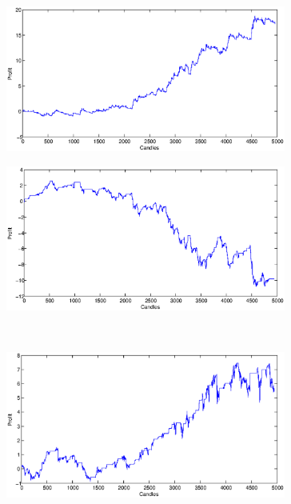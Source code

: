 \documentclass{tewiart}
\begin{document}
\begin{figure}[h]
\centering
\begin{minipage}{.49\linewidth}
\centering 
\includegraphics[width=0.82\textwidth]{images/S1a_usdjpy.eps}
\label{jedno}
\end{minipage}
\begin{minipage}{.49\linewidth}
\centering 
\includegraphics[width=0.82\textwidth]{images/S1b_usdjpy.eps}
\label{dwu}
\end{minipage}
\\
\begin{minipage}{.49\linewidth}
\centering 
\includegraphics[width=0.82\textwidth]{images/S1c_usdjpy.eps}
\label{cztero}
\end{minipage}
\begin{minipage}{.49\linewidth}

\end{minipage}
\end{figure}
\end{document}
